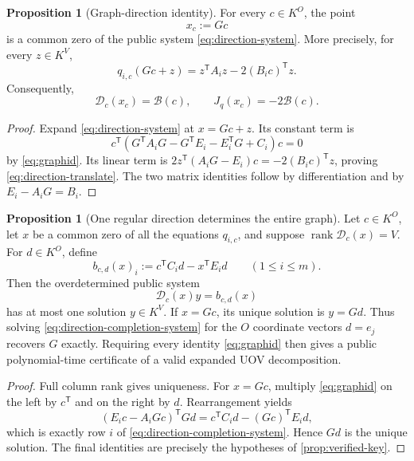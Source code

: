 \documentclass[11pt,a4paper]{article}
\theoremstyle{definition}
\newtheorem{proposition}[theorem]{Proposition}
\theoremstyle{remark}
\newcommand{\rank}{\operatorname{rank}}
\begin{document}
\begin{proposition}[Graph-direction identity]\label{prop:graph-direction-identity}
For every $c\in K^O$, the point
\[
 x_c:=Gc
\]
is a common zero of the public system \eqref{eq:direction-system}.  More precisely, for every $z\in K^V$,
\begin{equation}\label{eq:direction-translate}
 q_{i,c}(Gc+z)=z^{\mathsf T}A_iz-2(B_ic)^{\mathsf T}z.
\end{equation}
Consequently,
\[
 \mathcal D_c(x_c)=\mathcal B(c),
 \qquad
 J_q(x_c)=-2\mathcal B(c).
\]
\end{proposition}

\begin{proof}
Expand \eqref{eq:direction-system} at $x=Gc+z$.  Its constant term is
\[
 c^{\mathsf T}(G^{\mathsf T}A_iG-G^{\mathsf T}E_i-E_i^{\mathsf T}G+C_i)c=0
\]
by \eqref{eq:graphid}.  Its linear term is
$2z^{\mathsf T}(A_iG-E_i)c=-2(B_ic)^{\mathsf T}z$, proving \eqref{eq:direction-translate}.  The two matrix identities follow by differentiation and by $E_i-A_iG=B_i$.
\end{proof}

\begin{proposition}[One regular direction determines the entire graph]\label{prop:graph-direction-completion}
Let $c\in K^O$, let $x$ be a common zero of all the equations $q_{i,c}$, and suppose $\rank\mathcal D_c(x)=V$.  For $d\in K^O$, define
\begin{equation}\label{eq:direction-rhs}
 b_{c,d}(x)_i:=c^{\mathsf T}C_id-x^{\mathsf T}E_id
 \qquad(1\le i\le m).
\end{equation}
Then the overdetermined public system
\begin{equation}\label{eq:direction-completion-system}
 \mathcal D_c(x)y=b_{c,d}(x)
\end{equation}
has at most one solution $y\in K^V$.  If $x=Gc$, its unique solution is $y=Gd$.  Thus solving \eqref{eq:direction-completion-system} for the $O$ coordinate vectors $d=e_j$ recovers $G$ exactly.  Requiring every identity \eqref{eq:graphid} then gives a public polynomial-time certificate of a valid expanded UOV decomposition.
\end{proposition}

\begin{proof}
Full column rank gives uniqueness.  For $x=Gc$, multiply \eqref{eq:graphid} on the left by $c^{\mathsf T}$ and on the right by $d$.  Rearrangement yields
\[
 (E_ic-A_iGc)^{\mathsf T}Gd
 =c^{\mathsf T}C_id-(Gc)^{\mathsf T}E_id,
\]
which is exactly row $i$ of \eqref{eq:direction-completion-system}.  Hence $Gd$ is the unique solution.  The final identities are precisely the hypotheses of \cref{prop:verified-key}.
\end{proof}
\end{document}
